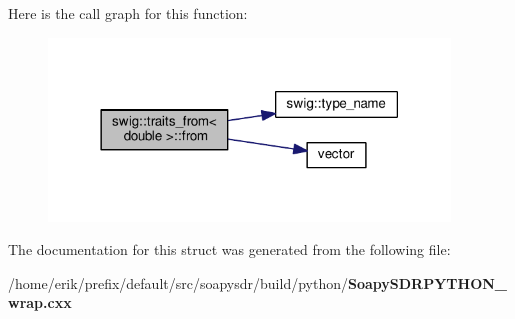 Here is the call graph for this function\+:
\nopagebreak
\begin{figure}[H]
\begin{center}
\leavevmode
\includegraphics[width=302pt]{d3/de7/structswig_1_1traits__from_3_01double_01_4_ae561b4392eb983662f203737585c2241_cgraph}
\end{center}
\end{figure}




The documentation for this struct was generated from the following file\+:\begin{DoxyCompactItemize}
\item 
/home/erik/prefix/default/src/soapysdr/build/python/{\bf Soapy\+S\+D\+R\+P\+Y\+T\+H\+O\+N\+\_\+wrap.\+cxx}\end{DoxyCompactItemize}
